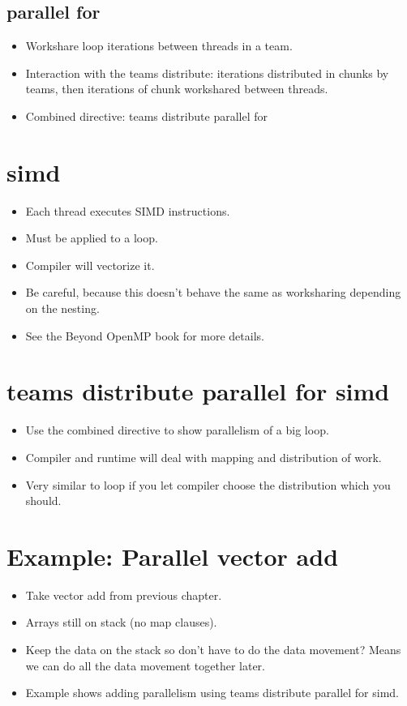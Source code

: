 \subsection{parallel for}
\begin{itemize}
  \item Workshare loop iterations between threads in a team.
  \item Interaction with the teams distribute: iterations distributed in chunks by teams, then iterations of chunk workshared between threads.
  \item Combined directive: teams distribute parallel for
\end{itemize}

\section{simd}
\begin{itemize}
  \item Each thread executes SIMD instructions.
  \item Must be applied to a loop.
  \item Compiler will vectorize it.
  \item Be careful, because this doesn't behave the same as worksharing depending on the nesting.
  \item See the Beyond OpenMP book for more details.
\end{itemize}

\section{teams distribute parallel for simd}
\label{sec:bud}
\begin{itemize}
  \item Use the combined directive to show parallelism of a big loop.
  \item Compiler and runtime will deal with mapping and distribution of work.
  \item Very similar to loop if you let compiler choose the distribution which you should.
\end{itemize}

\section{Example: Parallel vector add}
\begin{itemize}
  \item Take vector add from previous chapter.
  \item Arrays still on stack (no map clauses).
  \item Keep the data on the stack so don’t have to do the data movement? Means we can do all the data movement together later.
  \item Example shows adding parallelism using teams distribute parallel for simd.
\end{itemize}

